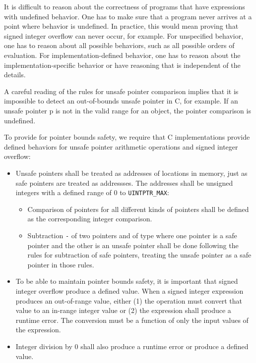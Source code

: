 It is difficult to reason about the correctness of programs that have
expressions with undefined behavior. One has to make sure that a program
never arrives at a point where behavior is undefined. In practice, this
would mean proving that signed integer overflow can never occur, for
example. For unspecified behavior, one has to reason about all possible
behaviors, such as all possible orders of evaluation. For
implementation-defined behavior, one has to reason about the
implementation-specific behavior or have reasoning that is independent
of the details.

A careful reading of the rules for unsafe pointer comparison implies
that it is impossible to detect an out-of-bounds unsafe pointer in C,
for example. If an unsafe pointer p is not in the valid range for an
object, the pointer comparison is undefined.

To provide for pointer bounds safety, we require that C implementations
provide defined behaviors for unsafe pointer arithmetic operations and
signed integer overflow:

\begin{itemize}
\item
  Unsafe pointers shall be treated as addresses of locations in memory,
  just as safe pointers are treated as addressses. The addresses shall
  be unsigned integers with a defined range of 0 to
  \texttt{UINTPTR\_MAX}:

  \begin{itemize}
  \item
    Comparison of pointers for all different kinds of pointers shall be
    defined as the corresponding integer comparison.
  \item
    Subtraction  \texttt{-}  of two pointers  and 
    of type  where one
    pointer is a safe pointer and the other is an unsafe pointer shall
    be done following the rules for subtraction of safe pointers,
    treating the unsafe pointer as a safe pointer in those rules.
  \end{itemize}
\end{itemize}

\begin{itemize}
\item
  To be able to maintain pointer bounds safety, it is important that
  signed integer overflow produce a defined value. When a signed integer
  expression produces an out-of-range value, either (1) the operation
  must convert that value to an in-range integer value or (2) the
  expression shall produce a runtime error. The conversion must be a
  function of only the input values of the expression.
\item
  Integer division by 0 shall also produce a runtime error or produce a
  defined value.
\end{itemize}

